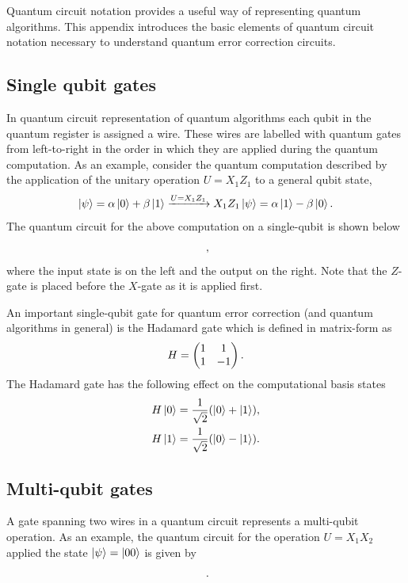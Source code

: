 \documentclass[]{arxiv}
\theoremstyle{plain}%
\theoremstyle{definition}
\theoremstyle{remark}
\begin{document}
Quantum circuit notation provides a useful way of representing quantum algorithms. This appendix introduces the basic elements of quantum circuit notation necessary to understand quantum error correction circuits.

\subsection{Single qubit gates}

In quantum circuit representation of quantum algorithms each qubit in the quantum register is assigned a wire. These wires are labelled with quantum gates from left-to-right in the order in which they are applied during the quantum computation. As an example, consider the quantum computation described by the application of the unitary operation $U=X_1Z_1$ to a general qubit state,
%
\begin{equation}
\ket{\psi}=\alpha\ket{0}+\beta\ket{1} \xrightarrow{U=X_1Z_1}  X_1Z_1 \ket{\psi} = \alpha \ket{1}-\beta\ket{0}\rm.
\end{equation}
%
The quantum circuit for the above computation on a single-qubit is shown below
%
$$
\vcenter{\hbox{
		\resizebox{!}{!}{}}}\rm,
$$
%
where the input state is on the left and the output on the right. Note that the $Z$-gate is placed before the $X$-gate as it is applied first.

An important single-qubit gate for quantum error correction (and quantum algorithms in general) is the Hadamard gate which is defined in matrix-form as
%
\begin{equation}
H=\left(\begin{matrix}
1&1\\1&-1
\end{matrix}\right)\rm.
\end{equation}
The Hadamard gate has the following effect on the computational basis states
\begin{equation}
\begin{split}
H\ket{0}=\frac{1}{\sqrt{2}}(\ket{0}+\ket{1}),\\
H\ket{1}=\frac{1}{\sqrt{2}}(\ket{0}-\ket{1}).
\end{split}
\end{equation}

\subsection{Multi-qubit gates}

A gate spanning two wires in a quantum circuit represents a multi-qubit operation. As an example, the quantum circuit for the operation $U=X_1X_2$ applied the state $\ket{\psi}=\ket{00}$ is given by
$$
\vcenter{\hbox{
		\resizebox{!}{!}{}}}\rm.
$$
\end{document}
